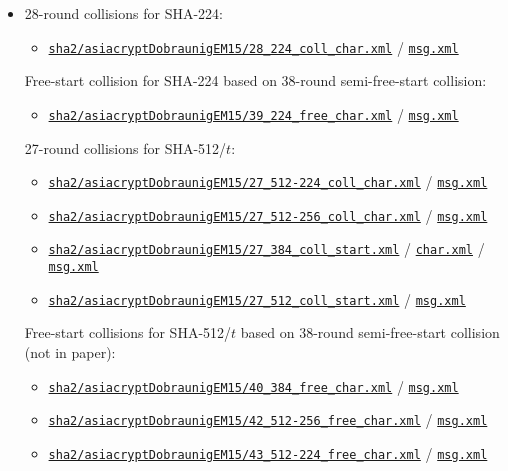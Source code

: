 \documentclass[11pt, a4paper]{article}
\newcommand{\hashlink}[2][black]{\href{https://extgit.iaik.tugraz.at/krypto/nldtool/blob/master/hash/#2}{\color{#1}\nolinkurl{#2}}}
\newcommand{\hashshrt}[3][black]{\href{https://extgit.iaik.tugraz.at/krypto/nldtool/blob/master/hash/#2}{\color{#1}\nolinkurl{#3}}}
\begin{document}
\begin{itemize}
  \item {}

    28-round collisions for SHA-224:
    \begin{itemize}
      \item \hashlink[done]{sha2/asiacryptDobraunigEM15/28_224_coll_char.xml}
          / \hashshrt[done]{sha2/asiacryptDobraunigEM15/28_224_coll_msg.xml}{msg.xml}
    \end{itemize}

    Free-start collision for SHA-224 based on 38-round semi-free-start collision:
    \begin{itemize}
      \item \hashlink[done]{sha2/asiacryptDobraunigEM15/39_224_free_char.xml}
          / \hashshrt[done]{sha2/asiacryptDobraunigEM15/39_224_free_msg.xml}{msg.xml}
    \end{itemize}

    27-round collisions for SHA-512/$t$:
    \begin{itemize}
      \item \hashlink[done]{sha2/asiacryptDobraunigEM15/27_512-224_coll_char.xml}
          / \hashshrt[done]{sha2/asiacryptDobraunigEM15/27_512-224_coll_msg.xml}{msg.xml}
      \item \hashlink[done]{sha2/asiacryptDobraunigEM15/27_512-256_coll_char.xml}
          / \hashshrt[done]{sha2/asiacryptDobraunigEM15/27_512-256_coll_msg.xml}{msg.xml}
      \item \hashlink[done]{sha2/asiacryptDobraunigEM15/27_384_coll_start.xml}
          / \hashshrt[done]{sha2/asiacryptDobraunigEM15/27_384_coll_char.xml}{char.xml}
          / \hashshrt[done]{sha2/asiacryptDobraunigEM15/27_384_coll_msg.xml}{msg.xml}
      \item \hashlink[done]{sha2/asiacryptDobraunigEM15/27_512_coll_start.xml}
          / \hashshrt[done]{sha2/asiacryptDobraunigEM15/27_512_coll_msg.xml}{msg.xml}
    \end{itemize}

    Free-start collisions for SHA-512/$t$ based on 38-round semi-free-start collision (not in paper):
    \begin{itemize}
      \item \hashlink[done]{sha2/asiacryptDobraunigEM15/40_384_free_char.xml}
          / \hashshrt[done]{sha2/asiacryptDobraunigEM15/40_384_free_msg.xml}{msg.xml}
      \item \hashlink[done]{sha2/asiacryptDobraunigEM15/42_512-256_free_char.xml}
          / \hashshrt[done]{sha2/asiacryptDobraunigEM15/42_512-256_free_msg.xml}{msg.xml}
      \item \hashlink[done]{sha2/asiacryptDobraunigEM15/43_512-224_free_char.xml}
          / \hashshrt[done]{sha2/asiacryptDobraunigEM15/43_512-224_free_msg.xml}{msg.xml}
    \end{itemize}


\end{itemize}
\end{document}
